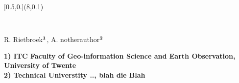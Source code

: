 




\begin{textblock}{\titlewidth}[0.5,0.](8,0.1)
\begin{center}
{
    {\Huge \color{itcoffblack} \sffamily \textbf{\ititle}\\[0.7cm]}

    {\color{itcoffblack} \huge \sffamily
R. Rietbroek$^{\footnotesize\textbf{1}}$,
    A. notherauthor$^{\footnotesize\textbf{2}}$}\\[0.5cm]}

    {\color{itcoffblack} \large \sffamily \textbf{1) ITC Faculty of Geo-information Science and Earth Observation, University of Twente\\
    2) Technical Universtity .., blah die Blah\\}}

\end{center}
\end{textblock}




